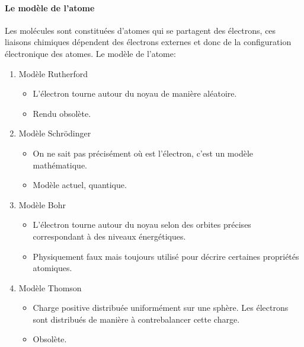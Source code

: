 \documentclass[10pt,a4paper]{book}
\begin{document}
\paragraph{Le modèle de l'atome}
Les molécules sont constituées d'atomes qui se partagent des électrons, ces liaisons chimiques dépendent des électrons externes et donc de la configuration électronique des atomes.
Le modèle de l'atome:
\begin{enumerate}
\item Modèle Rutherford
\begin{itemize}
\item L'électron tourne autour du noyau de manière aléatoire.
\item Rendu obsolète.
\end{itemize}
\item Modèle Schrödinger
\begin{itemize}
\item On ne sait pas précisément où est l’électron, c'est un modèle mathématique.
\item Modèle actuel, quantique.
\end{itemize}
\item Modèle Bohr
\begin{itemize}
\item L'électron tourne autour du noyau selon des orbites précises correspondant à des niveaux énergétiques.
\item Physiquement faux mais toujours utilisé pour décrire certaines propriétés atomiques.
\end{itemize}
\item Modèle Thomson
\begin{itemize}
\item Charge positive distribuée uniformément sur une sphère. Les électrons sont distribués de manière à contrebalancer cette charge.
\item Obsolète.
\end{itemize}
\end{enumerate}
\newpage
\end{document}
